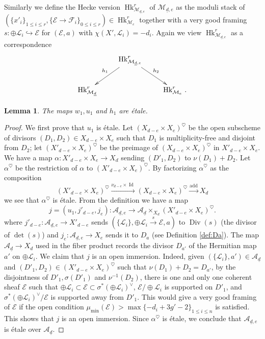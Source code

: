 \documentclass[reqno]{amsart}
\numberwithin{equation}{section}
\newcommand{\mrm}[1]{\mathrm{#1}}
\newcommand{\inj}{\hookrightarrow}
\DeclareMathOperator{\Div}{Div}
\DeclareMathOperator{\Id}{Id}
\DeclareMathOperator{\Hk}{Hk}
\newcommand\un{\underline}
\newcommand\xr{\xrightarrow}
\newcommand\op{\oplus}
\renewcommand\a\alpha
\newcommand{\s}{\sigma}
\newcommand\hs{\heartsuit}
\newcommand\cA{\mathcal{A}}
\newcommand\cE{\mathcal{E}}
\newcommand\cF{\mathcal{F}}
\newcommand\cL{\mathcal{L}}
\newcommand\cM{\mathcal{M}}
\newtheorem{lemma}[thm]{Lemma}
\theoremstyle{remark}
\numberwithin{equation}{section}
\begin{document}
Similarly we define the Hecke version $\Hk^{r}_{\cM_{\un d ,e}}$ of $\cM_{\un d,e}$ as the moduli stack of $(\{x'_{i}\}_{1\le i\le r}, \{\cE\to\cF_{i}\}_{0\le i\le r})\in \Hk^{r}_{\cM_{e}}$ together with a very good framing $s:\op \cL_{i}\inj \cE$ for $(\cE,a)$ with $\chi(X',\cL_{i})=-d_{i}$. Again we view $\Hk^{r}_{\cM_{\un d,e}}$ as a correspondence
\begin{equation*}
\xymatrix{ & \Hk^{r}_{\cM_{\un d,e}}\ar[dl]_{h_{1}}\ar[dr]^{h_{2}}\\
\Hk^{r}_{\cM_{\un d}} & &\Hk^{r}_{\cM_{e}}\,.}
\end{equation*}


\begin{lemma}\label{l:uwh et}
The maps $w_{1},u_1$ and $h_{1}$ are \'etale.
\end{lemma}
\begin{proof}
We first prove that $u_{1}$ is \'etale.  Let $(X_{d-e}\times X_{e})^{\hs}$ be the open subscheme of divisors $(D_{1},D_{2})\in X_{d-e}\times X_{e}$ such that $D_{1}$ is multiplicity-free and disjoint from $D_{2}$; let $(X'_{d-e}\times X_{e})^{\hs}$ be the preimage of $(X_{d-e}\times X_{e})^{\hs}$ in $X'_{d-e}\times X_{e}$. We have a map $\a: X'_{d-e}\times X_{e}\to X_{d}$ sending $(D'_{1}, D_{2})$ to $\nu(D_{1})+D_{2}$. Let $\a^{\hs}$ be the restriction of $\a$ to  $(X'_{d-e}\times X_{e})^{\hs}$. By factorizing $\a^{\hs}$ as the composition 
\begin{equation}
 (X'_{d-e}\times X_{e})^{\hs} \xr{\nu_{d-e}\times \Id}  (X_{d-e}\times X_{e})^{\hs}\xr{\mrm{add}}X_{d} 
 \end{equation}
we see that $\a^{\hs}$ is \'etale.  From the definition we have a map
\begin{equation}\label{Ade}
j=(u_{1}, j'_{d-e}, j_{e}): \cA_{\un d,e}\to \cA_{\un d}\times_{X_{d}}(X'_{d-e}\times X_{e})^{\hs}.
\end{equation}
where $j'_{d-e}: \cA_{\un d,e}\to X'_{d-e}$ sends $(\{\cL_{i}\}, \op \cL_{i}\xr{s}\cE,a)$ to $\Div(s)$ (the divisor of $\det(s)$) and $j_{e}: \cA_{\un d,e}\to X_{e}$ sends it to $D_{a}$  (see Definition \ref{def:Da}).  The map $\cA_{\un d}\to X_{d}$ used in the fiber product records the divisor $D_{a'}$ of the Hermitian map $a'$ on $\op \cL_{i}$. We claim that $j$ is an open immersion. Indeed, given $(\{\cL_{i}\},a')\in \cA_{\un d}$ and $(D'_{1}, D_{2})\in (X'_{d-e}\times X_{e})^{\hs}$ such that $\nu(D_{1})+D_{2}=D_{a'}$, by the disjointness of $D'_{1},\s(D'_{1})$ and $\nu^{-1}(D_{2})$, there is one and only one coherent sheaf $\cE$ such that $\op\cL_{i}\subset \cE\subset \s^{*}(\op\cL_{i})^{\vee}$, $\cE/\op\cL_{i}$ is supported on $D'_{1}$, and $\s^{*}(\op\cL_{i})^{\vee}/\cE$ is supported away from $D'_{1}$. This would give a very good framing of $\cE$ if the open condition $\mu_{\min}(\cE)>\max\{-d_{i}+3g'-2\}_{1\le i\le n}$ is satisfied. This shows that $j$ is an open immersion. Since $\a^{\hs}$ is \'etale, we conclude that $\cA_{\un d,e}$ is \'etale over $\cA_{\un d}$.


\end{proof}
\end{document}
